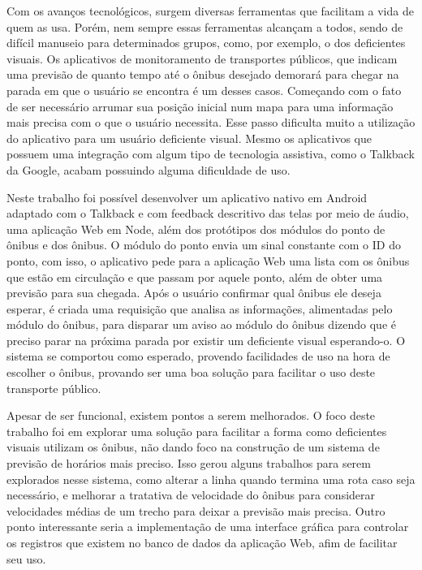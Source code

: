 \documentclass[
	12pt,				%
	oneside,			%
	a4paper,			%
	brazil				%
]{abntex2}
\begin{document}
{Com os avanços tecnológicos, surgem diversas ferramentas que facilitam a vida de quem as usa. Porém, nem sempre essas ferramentas alcançam a todos, sendo de difícil manuseio para determinados grupos, como, por exemplo, o dos deficientes visuais. Os aplicativos de monitoramento de transportes públicos, que indicam uma previsão de quanto tempo até o ônibus desejado demorará para chegar na parada em que o usuário se encontra é um desses casos. Começando com o fato de ser necessário arrumar sua posição inicial num mapa para uma informação mais precisa com o que o usuário necessita. Esse passo dificulta muito a utilização do aplicativo para um usuário deficiente visual. Mesmo os aplicativos que possuem uma integração com algum tipo de tecnologia assistiva, como o Talkback da Google, acabam possuindo alguma dificuldade de uso.

Neste trabalho foi possível desenvolver um aplicativo nativo em Android adaptado com o Talkback e com feedback descritivo das telas por meio de áudio, uma aplicação Web em Node, além dos protótipos dos módulos do ponto de ônibus e dos ônibus. O módulo do ponto envia um sinal constante com o ID do ponto, com isso, o aplicativo pede para a aplicação Web uma lista com os ônibus que estão em circulação e que passam por aquele ponto, além de obter uma previsão para sua chegada. Após o usuário confirmar qual ônibus ele deseja esperar, é criada uma requisição que analisa as informações, alimentadas pelo módulo do ônibus, para disparar um aviso ao módulo do ônibus dizendo que é preciso parar na próxima parada por existir um deficiente visual esperando-o. O sistema se comportou como esperado, provendo facilidades de uso na hora de escolher o ônibus, provando ser uma boa solução para facilitar o uso deste transporte público.

Apesar de ser funcional, existem pontos a serem melhorados. O foco deste trabalho foi em explorar uma solução para facilitar a forma como deficientes visuais utilizam os ônibus, não dando foco na construção de um sistema de previsão de horários mais preciso. Isso gerou alguns trabalhos para serem explorados nesse sistema, como alterar a linha quando termina uma rota caso seja necessário, e melhorar a tratativa de velocidade do ônibus para considerar velocidades médias de um trecho para deixar a previsão mais precisa. Outro ponto interessante seria a implementação de uma interface gráfica para controlar os registros que existem no banco de dados da aplicação Web, afim de facilitar seu uso.

\postextual

}
\end{document}
